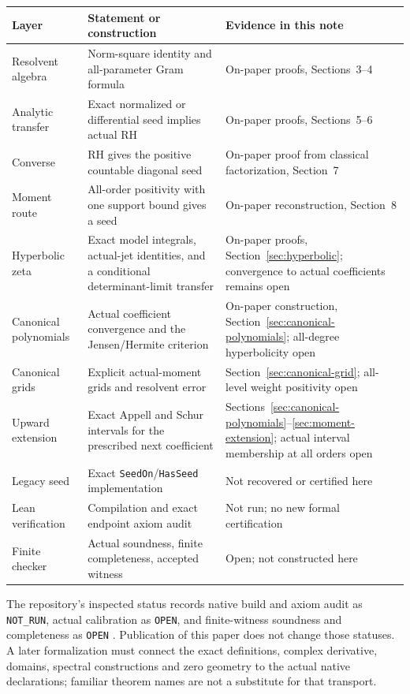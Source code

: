 \documentclass[11pt,a4paper]{article}
\numberwithin{equation}{section}
\theoremstyle{definition}
\theoremstyle{remark}
\begin{document}
\clearpage
\begin{longtable}{@{}>{\raggedright\arraybackslash}p{}>{\raggedright\arraybackslash}p{}>{\raggedright\arraybackslash}p{}@{}}
\toprule
\textbf{Layer}&\textbf{Statement or construction}&\textbf{Evidence in this note}\\
\midrule
\endhead
Resolvent algebra&Norm-square identity and all-parameter Gram formula&On-paper proofs, Sections~3--4\\
\addlinespace
Analytic transfer&Exact normalized or differential seed implies actual RH&On-paper proofs, Sections~5--6\\
\addlinespace
Converse&RH gives the positive countable diagonal seed&On-paper proof from classical factorization, Section~7\\
\addlinespace
Moment route&All-order positivity with one support bound gives a seed&On-paper reconstruction, Section~8\\
\addlinespace
Hyperbolic zeta&Exact model integrals, actual-jet identities, and a conditional determinant-limit transfer&On-paper proofs, Section~\ref{sec:hyperbolic}; convergence to actual coefficients remains open\\
\addlinespace
Canonical polynomials&Actual coefficient convergence and the Jensen/Hermite criterion&On-paper construction, Section~\ref{sec:canonical-polynomials}; all-degree hyperbolicity open\\
\addlinespace
Canonical grids&Explicit actual-moment grids and resolvent error&Section~\ref{sec:canonical-grid}; all-level weight positivity open\\
\addlinespace
Upward extension&Exact Appell and Schur intervals for the prescribed next coefficient&Sections~\ref{sec:canonical-polynomials}--\ref{sec:moment-extension}; actual interval membership at all orders open\\
\addlinespace
Legacy seed&Exact \texttt{SeedOn}/\texttt{HasSeed} implementation&Not recovered or certified here\\
\addlinespace
Lean verification&Compilation and exact endpoint axiom audit&Not run; no new formal certification\\
\addlinespace
Finite checker&Actual soundness, finite completeness, accepted witness&Open; not constructed here\\
\bottomrule
\end{longtable}

The repository's inspected status records native build and axiom audit
as \texttt{NOT\_RUN}, actual calibration as \texttt{OPEN}, and
finite-witness soundness and completeness as \texttt{OPEN}
\cite{repo-status}. Publication of this paper does not change those
statuses. A later formalization must connect the exact definitions,
complex derivative, domains, spectral constructions and zero geometry
to the actual native declarations; familiar theorem names are not a
substitute for that transport.
\end{document}
